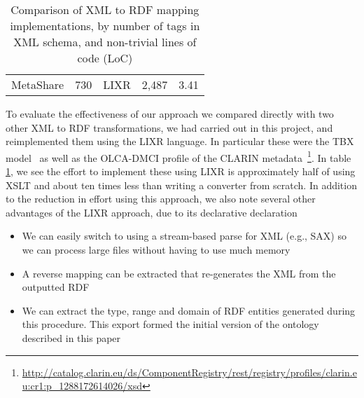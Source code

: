 \documentclass{llncs}
\begin{document}
{{\begin{table}
\begin{center}
\begin{tabular}{p{4cm}|cccc}
MetaShare & 730 & LIXR & 2,487 & 3.41 \\
\end{tabular}
\end{center}
\caption{\label{tab:locs}Comparison of XML to RDF mapping implementations,
by number of tags in XML schema, and non-trivial lines of code (LoC)}
\end{table}
To evaluate the effectiveness of our approach we compared directly with two other
XML to RDF transformations, we had carried out in this project, and
reimplemented them using the LIXR language. In particular these were the TBX
model~\cite{iso30042} as well as the OLCA-DMCI profile of the CLARIN
metadata~\footnote{\url{http://catalog.clarin.eu/ds/ComponentRegistry/rest/registry/profiles/clarin.eu:cr1:p\_1288172614026/xsd}}. In table \ref{tab:locs}, we see the
effort to implement these using LIXR is approximately half of using XSLT and
about ten times less than writing a converter from scratch.
In addition to the reduction in effort using this approach, we also note several
other advantages of the LIXR approach, due to its declarative declaration
\begin{itemize}
\item We can easily switch to using a stream-based parse for XML (e.g., SAX)
so we can process large files without having to use much memory
\item A reverse mapping can be extracted that re-generates the XML from the
outputted RDF
\item We can extract the type, range and domain of RDF entities generated
during this procedure. This export formed the initial version of the
ontology described in this paper
\end{itemize}
}}
\end{document}
